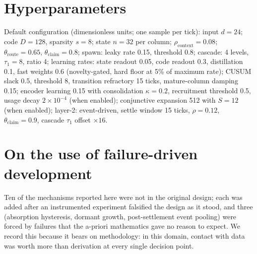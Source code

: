 \documentclass[11pt]{article}
\begin{document}
\section{Hyperparameters}
Default configuration (dimensionless units; one sample per tick):
input $d{=}24$; code $D{=}128$, sparsity $s{=}8$; state $n{=}32$ per
column; $\rho_{\mathrm{context}}{=}0.08$;
$\theta_{\mathrm{route}}{=}0.65$, $\theta_{\mathrm{claim}}{=}0.8$;
spawn: leaky rate 0.15, threshold 0.8; cascade: 4 levels,
$\tau_1{=}8$, ratio 4; learning rates: state readout 0.05, code readout
0.3, distillation 0.1, fast weights 0.6 (novelty-gated, hard floor at 5\%
of maximum rate); CUSUM slack 0.5, threshold 8, transition refractory 15
ticks, mature-column damping 0.15; encoder learning 0.15 with
consolidation $\kappa{=}0.2$, recruitment threshold 0.5, usage decay
$2\times10^{-4}$ (when enabled); conjunctive expansion 512 with $S{=}12$
(when enabled); layer-2: event-driven, settle window 15 ticks,
$\rho{=}0.12$, $\theta_{\mathrm{claim}}{=}0.9$, cascade $\tau_1$ offset
$\times16$.

\section{On the use of failure-driven development}
Ten of the mechanisms reported here were not in the original design; each
was added after an instrumented experiment falsified the design as it
stood, and three (absorption hysteresis, dormant growth, post-settlement
event pooling) were forced by failures that the a-priori mathematics gave
no reason to expect. We record this because it bears on methodology:
in this domain, contact with data was worth more than derivation at every
single decision point.
\end{document}

